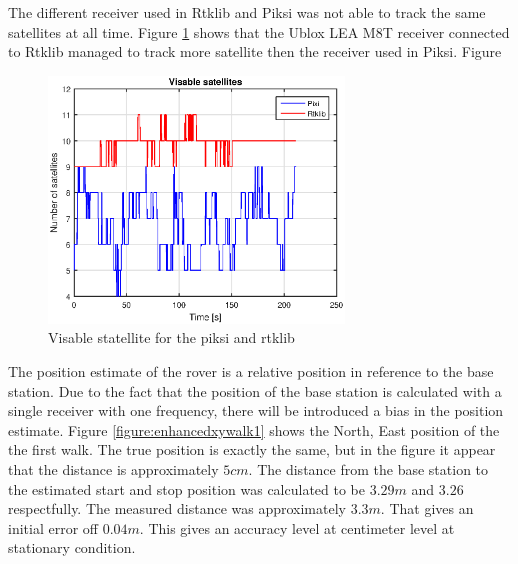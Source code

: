 %
The different receiver used in Rtklib and Piksi was not able to track the same satellites at all time. Figure \ref{figure:NumSatWalk1} shows that the Ublox LEA M8T receiver connected to Rtklib managed to track more satellite then the receiver used in Piksi.
Figure 
\begin{figure}[H]
	\centering
		\includegraphics[width=0.7\textwidth]{figs/plots/sv.eps}
		\caption{Visable statellite for the piksi and rtklib}
		\label{figure:NumSatWalk1}
\end{figure}
The position estimate of the rover is a relative position in reference to the base station. Due to the fact that the position of the base station is calculated with a single receiver with one frequency, there will be introduced a bias in the position estimate. Figure \ref{figure:enhancedxywalk1} shows the North, East position of the the first walk. The true position is exactly the same, but in the figure it appear that the distance is approximately $5cm$. The distance from the base station to the estimated start and stop position was calculated to be $3.29m$ and $3.26$ respectfully. The measured distance was approximately $3.3m$. That gives an initial error off $0.04m$. This gives an accuracy level at centimeter level at stationary condition. 
